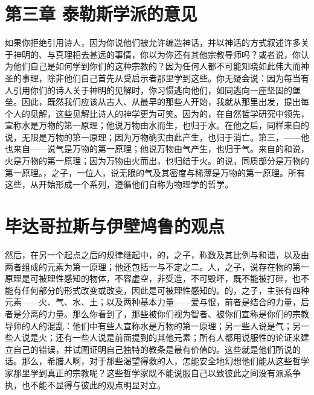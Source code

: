 
\section{第三章 泰勒斯学派的意见}

如果你拒绝引用诗人，因为你说他们被允许编造神话，并以神话的方式叙述许多关于神明的、与真理相去甚远的事情，你以为你还有其他宗教导师吗？或者说，你认为他们自己是如何学到你们的这种宗教的？因为任何人都不可能知晓如此伟大而神圣的事理，除非他们自己首先从受启示者那里学到这些。你无疑会说：因为每当有人引用你们的诗人关于神明的见解时，你习惯逃向他们，如同逃向一座坚固的堡垒。因此，既然我们应该从古人、从最早的那些人开始，我就从那里出发，提出每个人的见解，这些见解比诗人的神学更为可笑。因为的，在自然哲学研究中领先，宣称水是万物的第一原理；他说万物由水而生，也归于水。在他之后，同样来自的说，无限是万物的第一原理；因为万物确实由此产生，也归于消亡。第三，——他也来自——说气是万物的第一原理；他说万物由气产生，也归于气。来自的和说，火是万物的第一原理；因为万物由火而出，也归结于火。的说，同质部分是万物的第一原理。，之子，一位人，说无限的气及其密度与稀薄是万物的第一原理。所有这些，从开始形成一个系列，遵循他们自称为物理学的哲学。\par


\section{毕达哥拉斯与伊壁鸠鲁的观点}

然后，在另一个起点之后的规律继起中，的，之子，称数及其比例与和谐，以及由两者组成的元素为第一原理；他还包括一与不定之二。人，之子，说存在物的第一原理是可被理性感知的物体，不容虚空，非受造，不可毁坏，既不能被打碎，也不能有任何部分的形式改变或改变，因此是可被理性感知的。的，之子，主张有四种元素——火、气、水、土；以及两种基本力量——爱与恨，前者是结合的力量，后者是分离的力量。那么你看到了，那些被你们视为智者、被你们宣称是你们的宗教导师的人的混乱：他们中有些人宣称水是万物的第一原理；另一些人说是气；另一些人说是火；还有一些人说是前面提到的其他元素；所有人都用说服性的论证来建立自己的错误，并试图证明自己独特的教条是最有价值的。这些就是他们所说的话。那么，希腊人啊，对于那些渴望得救的人，怎能安全地幻想他们能从这些哲学家那里学到真正的宗教呢？这些哲学家既不能说服自己以致彼此之间没有派系争执，也不能不显得与彼此的观点明显对立。\par

